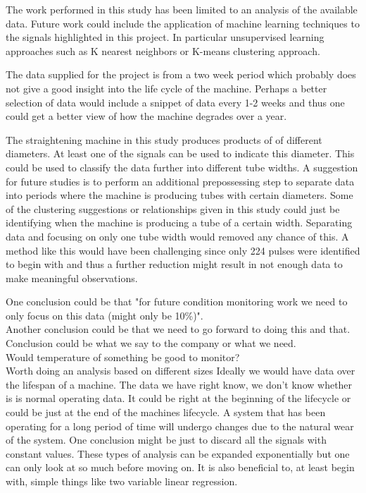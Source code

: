 \documentclass[]{article}
\begin{document}
The work performed in this study has been limited to an analysis of the available data. Future work could include the application of machine learning techniques to the signals highlighted in this project. In particular unsupervised learning approaches such as K nearest neighbors or K-means clustering approach.

The data supplied for the project is from a two week period which probably does not give a good insight into the life cycle of the machine. Perhaps a better selection of data would include a snippet of data every 1-2 weeks and thus one could get a better view of how the machine degrades over a year.

The straightening machine in this study produces products of of different diameters. At least one of the signals can be used to indicate this diameter. This could be used to classify the data further into different tube widths. A suggestion for future studies is to perform an additional prepossessing step to separate data into periods where the machine is producing tubes with certain diameters. Some of the clustering suggestions or relationships given in this study could just be identifying when the machine is producing a tube of a certain width. Separating data and focusing on only one tube width would removed any chance of this. A method like this would have been challenging since only 224 pulses were identified to begin with and thus a further reduction might result in not enough data to make meaningful observations.

One conclusion could be that "for future condition monitoring work we need to only focus on this data (might only be 10\%)".\\
Another conclusion could be that we need to go forward to doing this and that.\\
Conclusion could be what we say to the company or what we need.\\
Would temperature of something be good to monitor?\\
Worth doing an analysis based on different sizes
Ideally we would have data over the lifespan of a machine. The data we have right know, we don't know whether is is normal operating data. It could be right at the beginning of the lifecycle or could be just at the end of the machines lifecycle. A system that has been operating for a long period of time will undergo changes due to the natural wear of the system.
One conclusion might be just to discard all the signals with constant values.
These types of analysis can be expanded exponentially but one can only look at so much before moving on. It is also beneficial to, at least begin with, simple things like two variable linear regression.
\end{document}
